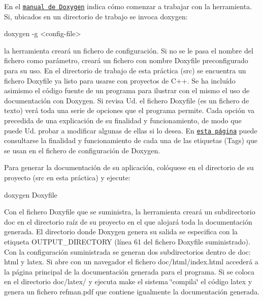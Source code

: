 En el \href{https://www.doxygen.nl/manual/starting.html}{\tt manual de Doxygen} indica cómo comenzar a trabajar con la herramienta. Si, ubicados en un directorio de trabajo se invoca {\ttfamily doxygen}\+: 
\begin{DoxyCode}
doxygen -g <config-file>
\end{DoxyCode}


la herramienta creará un fichero de configuración. Si no se le pasa el nombre del fichero como parámetro, creará un fichero con nombre {\ttfamily Doxyfile} preconfigurado para su uso. En el directorio de trabajo de esta práctica ({\ttfamily src}) se encuentra un fichero {\ttfamily Doxyfile} ya listo para usarse con proyectos de C++. Se ha incluído asimismo el código fuente de un programa para ilustrar con el mismo el uso de documentación con Doxygen. Si revisa Ud. el fichero {\ttfamily Doxyfile} (es un fichero de texto) verá toda una serie de opciones que el programa permite. Cada opción va precedida de una explicación de su finalidad y funcionamiento, de modo que puede Ud. probar a modificar algunas de ellas si lo desea. En \href{https://www.doxygen.nl/manual/config.html}{\tt esta página} puede consultarse la finalidad y funcionamiento de cada una de las etiquetas (Tags) que se usan en el fichero de configuración de Doxygen.

Para generar la documentación de su aplicación, colóquese en el directorio de su proyecto ({\ttfamily src} en esta práctica) y ejecute\+: 
\begin{DoxyCode}
doxygen Doxyfile
\end{DoxyCode}


Con el fichero {\ttfamily Doxyfile} que se suministra, la herramienta creará un subdirectorio {\ttfamily doc} en el directorio raíz de su proyecto en el que alojará toda la documentación generada. El directorio donde Doxygen genera su salida se especifica con la etiqueta {\ttfamily O\+U\+T\+P\+U\+T\+\_\+\+D\+I\+R\+E\+C\+T\+O\+RY} (línea 61 del fichero {\ttfamily Doxyfile} suministrado). Con la configuración suministrada se generan dos subdirectorios dentro de {\ttfamily doc}\+: {\ttfamily html} y {\ttfamily latex}. Si abre con un navegador el fichero {\ttfamily doc/html/index.\+html} accederá a la página principal de la documentación generada para el programa. Si se coloca en el directorio {\ttfamily doc/latex/} y ejecuta {\ttfamily make} el sistema \char`\"{}compila\char`\"{} el código latex y genera un fichero {\ttfamily refman.\+pdf} que contiene igualmente la documentación generada.

